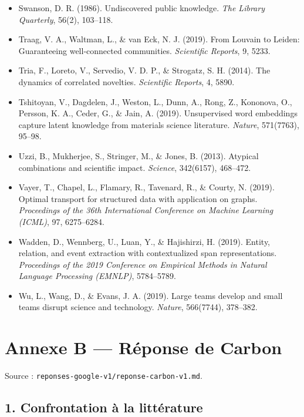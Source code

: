 \documentclass[a4paper,11pt]{article}
\begin{document}
\begin{itemize}
  for knowledge representation. \emph{PLOS ONE}, 7(1), e24274.
\item
  Swanson, D. R. (1986). Undiscovered public knowledge. \emph{The
  Library Quarterly}, 56(2), 103--118.
\item
  Traag, V. A., Waltman, L., \& van Eck, N. J. (2019). From Louvain to
  Leiden: Guaranteeing well-connected communities. \emph{Scientific
  Reports}, 9, 5233.
\item
  Tria, F., Loreto, V., Servedio, V. D. P., \& Strogatz, S. H. (2014).
  The dynamics of correlated novelties. \emph{Scientific Reports}, 4,
  5890.
\item
  Tshitoyan, V., Dagdelen, J., Weston, L., Dunn, A., Rong, Z., Kononova,
  O., Persson, K. A., Ceder, G., \& Jain, A. (2019). Unsupervised word
  embeddings capture latent knowledge from materials science literature.
  \emph{Nature}, 571(7763), 95--98.
\item
  Uzzi, B., Mukherjee, S., Stringer, M., \& Jones, B. (2013). Atypical
  combinations and scientific impact. \emph{Science}, 342(6157),
  468--472.
\item
  Vayer, T., Chapel, L., Flamary, R., Tavenard, R., \& Courty, N.
  (2019). Optimal transport for structured data with application on
  graphs. \emph{Proceedings of the 36th International Conference on
  Machine Learning (ICML)}, 97, 6275--6284.
\item
  Wadden, D., Wennberg, U., Luan, Y., \& Hajishirzi, H. (2019). Entity,
  relation, and event extraction with contextualized span
  representations. \emph{Proceedings of the 2019 Conference on Empirical
  Methods in Natural Language Processing (EMNLP)}, 5784--5789.
\item
  Wu, L., Wang, D., \& Evans, J. A. (2019). Large teams develop and
  small teams disrupt science and technology. \emph{Nature}, 566(7744),
  378--382.
\end{itemize}
\clearpage
\section*{Annexe B — Réponse de Carbon}
{\small Source : \texttt{reponses-google-v1/reponse-carbon-v1.md}.}\par
\subsection*{1. Confrontation à la littérature}
\end{document}
